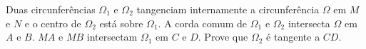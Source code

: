 Duas circunferências $\Omega_{1}$ e $\Omega_{2}$ tangenciam internamente a circunferência $\Omega$ em $M$ e $N$ e o centro de $\Omega_{2}$ está sobre $\Omega_{1}$. A corda comum de $\Omega_{1}$ e $\Omega_{2}$ intersecta $\Omega$ em $A$ e $B$. $MA$ e $MB$ intersectam $\Omega_{1}$ em $C$ e $D$. Prove que $\Omega_{2}$ é tangente a $CD$.
